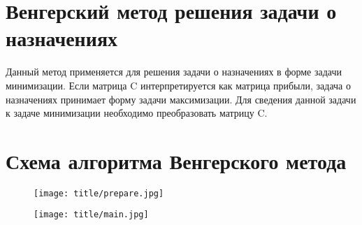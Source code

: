 
\section{Венгерский метод решения задачи о назначениях}

Данный метод применяется для решения задачи о назначениях в форме задачи минимизации. 
Если матрица C интерпретируется как матрица прибыли, задача о назначениях принимает 
форму задачи максимизации. Для сведения данной задачи к задаче минимизации необходимо 
преобразовать матрицу C.

\section{Схема алгоритма Венгерского метода}

\begin{figure}[h!]
    \begin{center}
        \texttt{[image: title/prepare.jpg]}
    \end{center}
\end{figure}

\begin{figure}[h!]
    \begin{center}
        \texttt{[image: title/main.jpg]}
    \end{center}
\end{figure}